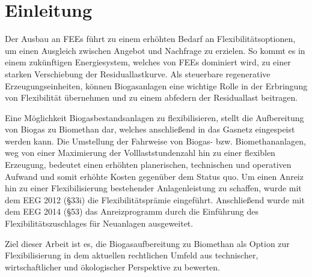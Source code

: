 \section{Einleitung}

Der Ausbau an \glspl{FEE} führt zu einem erhöhten Bedarf an Flexibilitätsoptionen, um einen Ausgleich zwischen Angebot und Nachfrage zu erzielen. So kommt es in einem zukünftigen Energiesystem, welches von \glspl{FEE} dominiert wird, zu einer starken Verschiebung der Residuallastkurve. Als steuerbare regenerative Erzeugungseinheiten, können Biogasanlagen eine wichtige Rolle in der Erbringung von Flexibilität übernehmen und zu einem abfedern der Residuallast beitragen. \parencite{ISE2013}\smallskip

Eine Möglichkeit Biogasbestandsanlagen zu flexibilisieren, stellt die Aufbereitung von Biogas zu Biomethan dar, welches anschließend in das Gasnetz eingespeist werden kann. Die Umstellung der Fahrweise von Biogas- bzw. Biomethananlagen, weg von einer Maximierung der Volllaststundenzahl hin zu einer flexiblen Erzeugung, bedeutet einen erhöhten planerischen, technischen und operativen Aufwand und somit erhöhte Kosten gegenüber dem Status quo. Um einen Anreiz hin zu einer Flexibilisierung bestehender Anlagenleistung zu schaffen, wurde mit dem \gls{EEG} 2012 (\S 33i) die Flexibilitätsprämie eingeführt. Anschließend wurde mit dem \gls{EEG} 2014 (\S 53) das Anreizprogramm durch die Einführung des Flexibilitätszuschlages für Neuanlagen ausgeweitet. \parencite{DanielGromke2019}\smallskip

Ziel dieser Arbeit ist es, die Biogasaufbereitung zu Biomethan als Option zur Flexibilisierung in dem aktuellen rechtlichen Umfeld aus technischer, wirtschaftlicher und ökologischer Perspektive zu bewerten.